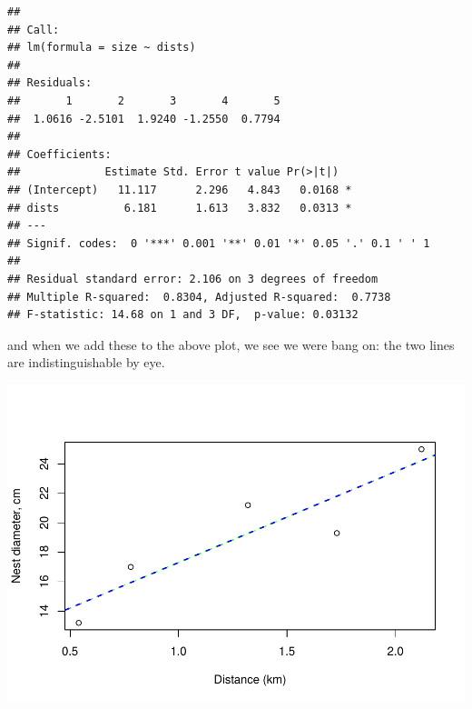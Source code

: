 \documentclass[
]{book}
\newenvironment{Shaded}{\begin{snugshade}}{\end{snugshade}}
\newcommand{\AttributeTok}[1]{\textcolor[rgb]{0.77,0.63,0.00}{#1}}
\newcommand{\DecValTok}[1]{\textcolor[rgb]{0.00,0.00,0.81}{#1}}
\newcommand{\FunctionTok}[1]{\textcolor[rgb]{0.00,0.00,0.00}{#1}}
\newcommand{\NormalTok}[1]{#1}
\newcommand{\SpecialCharTok}[1]{\textcolor[rgb]{0.00,0.00,0.00}{#1}}
\newcommand{\StringTok}[1]{\textcolor[rgb]{0.31,0.60,0.02}{#1}}
\begin{document}
\begin{verbatim}
## 
## Call:
## lm(formula = size ~ dists)
## 
## Residuals:
##       1       2       3       4       5 
##  1.0616 -2.5101  1.9240 -1.2550  0.7794 
## 
## Coefficients:
##             Estimate Std. Error t value Pr(>|t|)  
## (Intercept)   11.117      2.296   4.843   0.0168 *
## dists          6.181      1.613   3.832   0.0313 *
## ---
## Signif. codes:  0 '***' 0.001 '**' 0.01 '*' 0.05 '.' 0.1 ' ' 1
## 
## Residual standard error: 2.106 on 3 degrees of freedom
## Multiple R-squared:  0.8304, Adjusted R-squared:  0.7738 
## F-statistic: 14.68 on 1 and 3 DF,  p-value: 0.03132
\end{verbatim}

and when we add these to the above plot, we see we were bang on: the two lines are indistinguishable by eye.

\begin{Shaded}
\end{Shaded}

\includegraphics{ECOMODbook_files/figure-latex/ch13.30.5-1.pdf}
\end{document}
